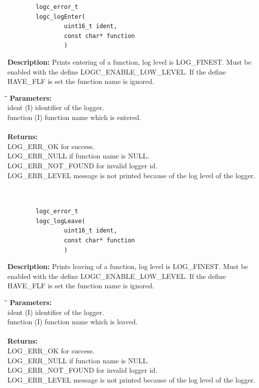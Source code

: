 \documentclass[a4paper, titlepage, 11pt]{article}
\begin{document}
\small
\begin{verbatim}
        logc_error_t
        logc_logEnter(
                uint16_t ident,
                const char* function
                )
\end{verbatim}
\normalsize
\textbf{Description:} Prints entering of a function, log level is LOG\_FINEST.
             Must be enabled with the define LOGC\_ENABLE\_LOW\_LEVEL.
             If the define HAVE\_FLF is set the function name is ignored.
\begin{tabbing}
\hspace*{1cm}\=\hspace*{2cm}\=\hspace*{0,6cm}\= \kill
\textbf{Parameters:} \\
\> ident \> (I) identifier of the logger. \\
\> function \> (I) function name which is entered. \\ \\
\textbf{Returns:} \\
\> LOG\_ERR\_OK for success. \\
\> LOG\_ERR\_NULL if function name is NULL. \\
\> LOG\_ERR\_NOT\_FOUND for invalid logger id. \\
\> LOG\_ERR\_LEVEL message is not printed because of the log level of the logger. \\ \\ \\
\end{tabbing}

\small
\begin{verbatim}
        logc_error_t
        logc_logLeave(
                uint16_t ident,
                const char* function
                )
\end{verbatim}
\normalsize
\textbf{Description:} Prints leaving of a function, log level is LOG\_FINEST.
             Must be enabled with the define LOGC\_ENABLE\_LOW\_LEVEL.
             If the define HAVE\_FLF is set the function name is ignored.
\begin{tabbing}
\hspace*{1cm}\=\hspace*{2cm}\=\hspace*{0,6cm}\= \kill
\textbf{Parameters:} \\
\> ident \> (I) identifier of the logger. \\
\> function \> (I) function name which is leaved. \\ \\
\textbf{Returns:} \\
\> LOG\_ERR\_OK for success. \\
\> LOG\_ERR\_NULL if function name is NULL. \\
\> LOG\_ERR\_NOT\_FOUND for invalid logger id. \\
\> LOG\_ERR\_LEVEL message is not printed because of the log level of the logger. \\
\end{tabbing}
\end{document}
